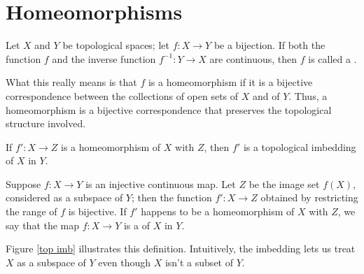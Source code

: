 
\newpage

\section{Homeomorphisms}\label{homeomorphism}

\begin{definition}[Homeomorphism]
	Let $X$ and $Y$ be topological spaces; let $f:X \to Y$ be a 
	bijection. If both the function $f$ and the inverse function 
	$f^{-1}:Y \to X$ are continuous, then $f$ is called a 
	.
\end{definition}

What this really means is that $f$ is a homeomorphism if it is a 
bijective correspondence between the collections of open sets of 
$X$ and of $Y$. Thus, a homeomorphism is a bijective 
correspondence that preserves the topological structure involved.

\begin{marginfigure}
	\centering
	\caption{If $f':X \to Z$ is a homeomorphism of $X$ with $Z$, 
	then $f'$ is a topological imbedding of $X$ in $Y$.}\label{top 
	imb}
\end{marginfigure}

\begin{definition}
	Suppose $f:X \to Y$ is an injective continuous map. Let $Z$ be 
	the image set $f(X)$, considered as a subspace of $Y$; then the 
	function $f':X \to Z$ obtained by restricting the range of $f$ 
	is bijective. If $f'$ happens to be a homeomorphism of $X$ with 
	$Z$, we say that the map $f:X \to Y$ is a  of $X$ in $Y$.
\end{definition}

Figure \ref{top imb} illustrates this definition. Intuitively, the 
imbedding lets us treat $X$ as a subspace of $Y$ even though $X$ 
isn't a subset of $Y$.






























